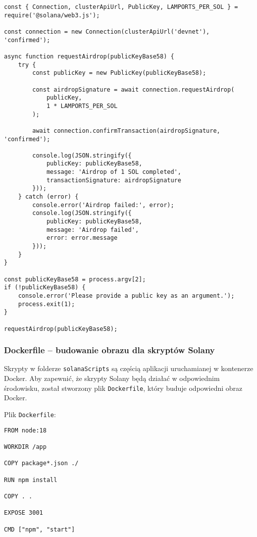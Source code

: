 \begin{lstlisting}
const { Connection, clusterApiUrl, PublicKey, LAMPORTS_PER_SOL } = require('@solana/web3.js');

const connection = new Connection(clusterApiUrl('devnet'), 'confirmed');

async function requestAirdrop(publicKeyBase58) {
    try {
        const publicKey = new PublicKey(publicKeyBase58);

        const airdropSignature = await connection.requestAirdrop(
            publicKey,
            1 * LAMPORTS_PER_SOL
        );

        await connection.confirmTransaction(airdropSignature, 'confirmed');

        console.log(JSON.stringify({
            publicKey: publicKeyBase58,
            message: 'Airdrop of 1 SOL completed',
            transactionSignature: airdropSignature
        }));
    } catch (error) {
        console.error('Airdrop failed:', error);
        console.log(JSON.stringify({
            publicKey: publicKeyBase58,
            message: 'Airdrop failed',
            error: error.message
        }));
    }
}

const publicKeyBase58 = process.argv[2];
if (!publicKeyBase58) {
    console.error('Please provide a public key as an argument.');
    process.exit(1);
}

requestAirdrop(publicKeyBase58);

\end{lstlisting}

\subsubsection{Dockerfile – budowanie obrazu dla skryptów Solany}

Skrypty w folderze \texttt{solanaScripts} są częścią aplikacji uruchamianej w kontenerze Docker. Aby zapewnić, że skrypty Solany będą działać w odpowiednim środowisku, został stworzony plik \texttt{Dockerfile}, który buduje odpowiedni obraz Docker.

Plik \texttt{Dockerfile}:

\begin{lstlisting}
FROM node:18

WORKDIR /app

COPY package*.json ./

RUN npm install

COPY . .

EXPOSE 3001

CMD ["npm", "start"]
\end{lstlisting}

